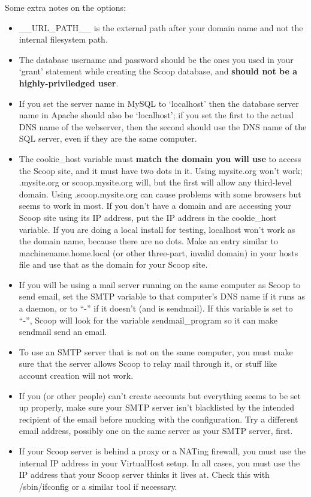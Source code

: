 Some extra notes on the options:
\begin{itemize}
\item \_\_URL\_PATH\_\_ is the external path after your domain name and not the internal filesystem path.
\item The database username and password should be the ones you used in your `grant' statement while creating the Scoop database, and {\bf should not be a highly-priviledged user}.
\item If you set the server name in MySQL to `localhost' then the database server name in Apache should also be `localhost'; if you set the first to the actual DNS name of the webserver, then the second should use the DNS name of the SQL server, even if they are the same computer.
\item The cookie\_host variable must {\bf match the domain you will use} to access the Scoop site, and it must have two dots in it.  Using mysite.org won't work; .mysite.org or scoop.mysite.org will, but the first will allow any third-level domain.  Using .scoop.mysite.org can cause problems with some browsers but seems to work in most.  If you don't have a domain and are accessing your Scoop site using its IP address, put the IP address in the cookie\_host variable. If you are doing a local install for testing, localhost won't work as the domain name, because there are no dots. Make an entry similar to machinename.home.local (or other three-part, invalid domain) in your hosts file and use that as the domain for your Scoop site.
\item If you will be using a mail server running on the same computer as Scoop to send email, set the SMTP variable to that computer's DNS name if it runs as a daemon, or to ``-'' if it doesn't (and is sendmail).  If this variable is set to ``-'', Scoop will look for the variable sendmail\_program so it can make sendmail send an email.
\item To use an SMTP server that is not on the same computer, you must make sure that the server allows Scoop to relay mail through it, or stuff like account creation will not work.
\item If you (or other people) can't create accounts but everything seems to be set up properly, make sure your SMTP server isn't blacklisted by the intended recipient of the email before mucking with the configuration.  Try a different email address, possibly one on the same server as your SMTP server, first.
\item If your Scoop server is behind a proxy or a NATing firewall, you must use the internal IP address in your VirtualHost setup.  In all cases, you must use the IP address that your Scoop server thinks it lives at.  Check this with /sbin/ifconfig or a similar tool if necessary.
\end{itemize}

